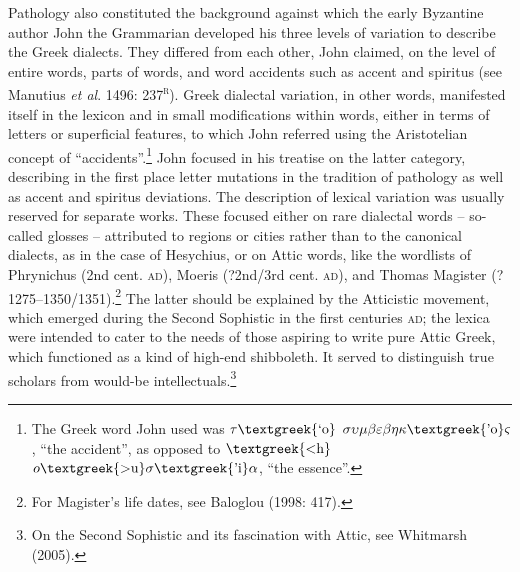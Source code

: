 \documentclass[12pt]{article}
\newenvironment{styleCatalogusnotities}{\renewcommand\baselinestretch{1.25}\setlength\leftskip{0in}\setlength\rightskip{0in}\setlength\parindent{0in}\setlength\parfillskip{0pt plus 1fil}\setlength\parskip{0in plus 1pt}\writerlistparindent\writerlistleftskip\leavevmode\normalfont\normalsize\writerlistlabel\ignorespaces}{\unskip\vspace{0in plus 1pt}\par}
\newcommand\writerlistleftskip{}
\newcommand\writerlistparindent{}
\newcommand\writerlistlabel{}
\begin{document}
\begin{styleCatalogusnotities}
Pathology also constituted the background against which the early Byzantine author John the Grammarian developed his three levels of variation to describe the Greek dialects. They differed from each other, John claimed, on the level of entire words, parts of words, and word accidents such as accent and spiritus (see Manutius \textit{et al}. 1496: 237\textsc{\textsuperscript{r}}). Greek dialectal variation, in other words, manifested itself in the lexicon and in small modifications within words, either in terms of letters or superficial features, to which John referred using the Aristotelian concept of “accidents”.\footnote{ The Greek word John used was $\tau \text{\textgreek{`o}}$ $\sigma \upsilon \mu \beta \varepsilon \beta \eta \kappa \text{\textgreek{'o}}\varsigma $, “the accident”, as opposed to $\text{\textgreek{<h}}$ $o\text{\textgreek{>u}}\sigma \text{\textgreek{'i}}\alpha $, “the essence”.} John focused in his treatise on the latter category, describing in the first place letter mutations in the tradition of pathology as well as accent and spiritus deviations. The description of lexical variation was usually reserved for separate works. These focused either on rare dialectal words – so-called glosses – attributed to regions or cities rather than to the canonical dialects, as in the case of Hesychius, or on Attic words, like the wordlists of Phrynichus (2nd cent. \textsc{ad}), Moeris (?2nd/3rd cent. \textsc{ad}), and Thomas Magister (?1275–1350/1351).\footnote{\textrm{ For Magister’s life dates, see Baloglou (1998: 417).}} The latter should be explained by the Atticistic movement, which emerged during the Second Sophistic in the first centuries \textsc{ad}; the lexica were intended to cater to the needs of those aspiring to write pure Attic Greek, which functioned as a kind of high-end shibboleth. It served to distinguish true scholars from would-be intellectuals.\footnote{ On the Second Sophistic and its fascination with Attic, see Whitmarsh (2005).}
\end{styleCatalogusnotities}
\end{document}
